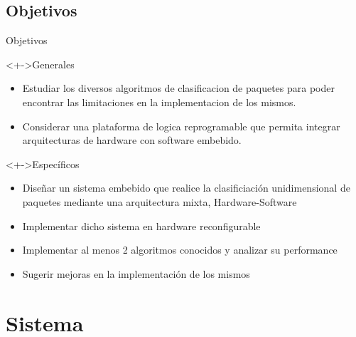\documentclass[xcolor=dvipsnames]{beamer}
\begin{document}
\subsection{Objetivos}
\begin{frame}{Objetivos}
\begin{block}<+->{Generales}   
    \begin{itemize}
      \scriptsize
      \item Estudiar los diversos algoritmos de clasificacion de paquetes para poder encontrar las limitaciones en la implementacion de los mismos.
      \item Considerar una plataforma de logica reprogramable que permita integrar arquitecturas de hardware con software embebido.
    \end{itemize}
  \end{block}
  
\begin{block}<+->{Específicos}   
    \begin{itemize}
      \scriptsize
     	\item Diseñar un sistema embebido que realice la clasificiación unidimensional de paquetes mediante una arquitectura mixta, Hardware-Software
	\item Implementar dicho sistema en hardware reconfigurable
	\item Implementar al menos 2 algoritmos conocidos y analizar su performance
	\item Sugerir mejoras en la implementación de los mismos   
    \end{itemize}
  \end{block}
\end{frame}

\section{Sistema}
\end{document}
